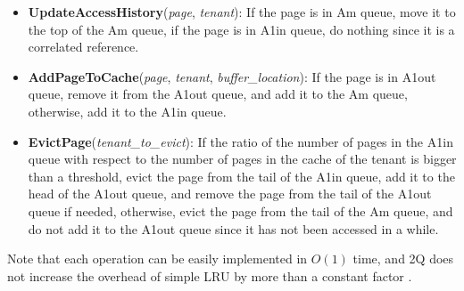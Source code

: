 \begin{itemize}
    \item \textbf{UpdateAccessHistory}(\textit{page}, \textit{tenant}): If the page is 
    in Am queue, move it to the top of the Am queue, if the page is in A1in queue, do
    nothing since it is a correlated reference.
    \item \textbf{AddPageToCache}(\textit{page}, \textit{tenant}, \textit{buffer\_location}): If
    the page is in A1out queue, remove it from the A1out queue, and add it to the Am queue,
    otherwise, add it to the A1in queue.
    \item \textbf{EvictPage}(\textit{tenant\_to\_evict}): If the ratio of the number of pages
    in the A1in queue with respect to the number of pages in the cache of the tenant is bigger
    than a threshold, evict the page from the tail of the A1in queue, add it to the head of the
    A1out queue, and remove the page from the tail of the A1out queue if needed, otherwise, evict
    the page from the tail of the Am queue, and do not add it to the A1out queue since it has not
    been accessed in a while.
\end{itemize}

Note that each operation can be easily implemented in $O(1)$ time, and 2Q does not increase 
the overhead of simple LRU by more than a constant factor \cite{2q-article}.

